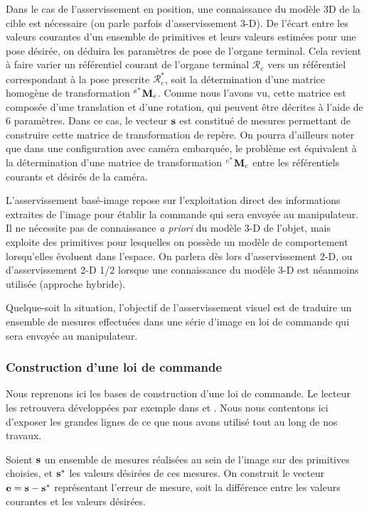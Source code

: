 Dans le cas de l'asservissement en position, une connaissance du modèle 3D de la cible est nécessaire (on parle parfois d'asservissement 3-D). De l'écart entre les valeurs courantes d'un ensemble de primitives et leurs valeurs estimées pour une pose désirée, on déduira les paramètres de pose de l'organe terminal. Cela revient à faire varier un référentiel courant de l'organe terminal $\mathcal R_e$ vers un référentiel correspondant à la pose prescrite $\mathcal R_e^*$, soit la détermination d'une matrice homogène de transformation ${}^{e^*}{\bf M}_e$. Comme nous l'avons vu, cette matrice est composée d'une translation et d'une rotation, qui peuvent être décrites à l'aide de $6$ paramètres. Dans ce cas, le vecteur ${\bf s}$ est constitué de mesures permettant de construire cette matrice de transformation de repère. On pourra d'ailleurs noter que dans une configuration avec caméra embarquée, le problème est équivalent à la détermination d'une matrice de transformation ${}^{c^*}{\bf M}_c$ entre les référentiels courants et désirés de la caméra.

L'asservissement basé-image repose sur l'exploitation direct des informations extraites de l'image pour établir la commande qui sera envoyée au manipulateur. Il ne nécessite pas de connaissance {\it a priori} du modèle 3-D de l'objet, mais exploite des primitives pour lesquelles on possède un modèle de comportement lorsqu'elles évoluent dans l'espace. On parlera dès lors d'asservissement 2-D, ou d'asservissement 2-D 1/2 lorsque une connaissance du modèle 3-D est néanmoins utilisée (approche hybride).

Quelque-soit la situation, l'objectif de l'asservissement visuel est de traduire un ensemble de mesures effectuées dans une série d'image en loi de commande qui sera envoyée au manipulateur.

\subsubsection{Construction d'une loi de commande}

Nous reprenons ici les bases de construction d'une loi de commande. Le lecteur les retrouvera développées par exemple dans \cite{chaumette:tuto01} et \cite{chaumette:tuto02}. Nous nous contentons ici d'exposer les grandes lignes de ce que nous avons utilisé tout au long de nos travaux.

Soient ${\bf s}$ un ensemble de mesures réalisées au sein de l'image sur des primitives choisies, et ${\bf s}^*$ les valeurs désirées de ces mesures. On construit le vecteur ${\bf e} = {\bf s} - {\bf s}^*$ représentant l'erreur de mesure, soit la différence entre les valeurs courantes et les valeurs désirées.

